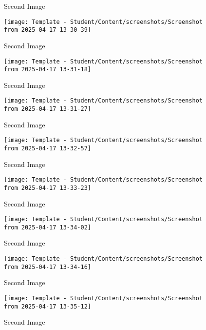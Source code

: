 \begin{enumerate}
\begin{figure}[htbp]
      \caption{Second Image}
      \label{fig:vert2}
    \end{figure}
    \begin{figure}[htbp]
      \centering
      \texttt{[image: Template - Student/Content/screenshots/Screenshot from 2025-04-17 13-30-39]}
      \caption{Second Image}
      \label{fig:vert2}
    \end{figure}
    \begin{figure}[htbp]
      \centering
      \texttt{[image: Template - Student/Content/screenshots/Screenshot from 2025-04-17 13-31-18]}
      \caption{Second Image}
      \label{fig:vert2}
    \end{figure}
    \begin{figure}[htbp]
      \centering
      \texttt{[image: Template - Student/Content/screenshots/Screenshot from 2025-04-17 13-31-27]}
      \caption{Second Image}
      \label{fig:vert2}
    \end{figure}
    \begin{figure}[htbp]
      \centering
      \texttt{[image: Template - Student/Content/screenshots/Screenshot from 2025-04-17 13-32-57]}
      \caption{Second Image}
      \label{fig:vert2}
    \end{figure}
    \begin{figure}[htbp]
      \centering
      \texttt{[image: Template - Student/Content/screenshots/Screenshot from 2025-04-17 13-33-23]}
      \caption{Second Image}
      \label{fig:vert2}
    \end{figure}
    \begin{figure}[htbp]
      \centering
      \texttt{[image: Template - Student/Content/screenshots/Screenshot from 2025-04-17 13-34-02]}
      \caption{Second Image}
      \label{fig:vert2}
    \end{figure}
    \begin{figure}[htbp]
      \centering
      \texttt{[image: Template - Student/Content/screenshots/Screenshot from 2025-04-17 13-34-16]}
      \caption{Second Image}
      \label{fig:vert2}
    \end{figure}
    \begin{figure}[htbp]
      \centering
      \texttt{[image: Template - Student/Content/screenshots/Screenshot from 2025-04-17 13-35-12]}
      \caption{Second Image}
      \label{fig:vert2}
    \end{figure}

\end{enumerate}
